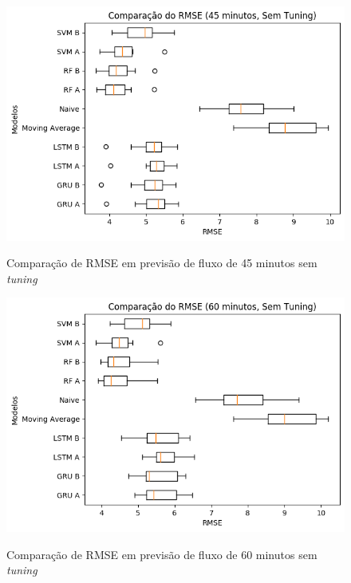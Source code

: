 \begin{figure}[htbp]
    \centering
    \includegraphics[scale=0.8]{monography/img/snapshots/comparacao_do_rmse_(45_minutos,_sem_tuning)_performance_boxes.png}
    \label{figure:comparacao_previsao_rmse_45_sem_tuning}
    \caption{Comparação de RMSE em previsão de fluxo de 45 minutos sem \textit{tuning}}
\end{figure}

\begin{figure}[htbp]
    \centering
    \includegraphics[scale=0.8]{monography/img/snapshots/comparacao_do_rmse_(60_minutos,_sem_tuning)_performance_boxes.png}
    \label{figure:comparacao_previsao_rmse_60_sem_tuning}
    \caption{Comparação de RMSE em previsão de fluxo de 60 minutos sem \textit{tuning}}
\end{figure}

